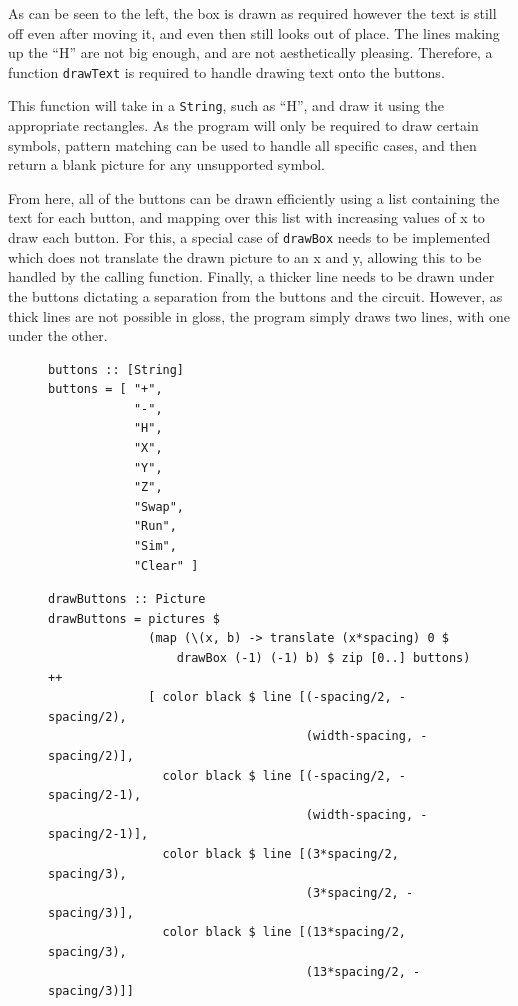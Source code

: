 \documentclass[a4paper,10pt, titlepage, twoside]{article}
\begin{document}
As can be seen to the left, the box is drawn as required however the text is still off even after moving it, and even then still looks out of place. The lines making up the ``H'' are not big enough, and are not aesthetically pleasing. Therefore, a function \texttt{drawText} is required to handle drawing text onto the buttons.\par
This function will take in a \texttt{String}, such as ``H'', and draw it using the appropriate rectangles. As the program will only be required to draw certain symbols, pattern matching can be used to handle all specific cases, and then return a blank picture for any unsupported symbol.\par
From here, all of the buttons can be drawn efficiently using a list containing the text for each button, and mapping over this list with increasing values of x to draw each button. For this, a special case of \texttt{drawBox} needs to be implemented which does not translate the drawn picture to an x and y, allowing this to be handled by the calling function. Finally, a thicker line needs to be drawn under the buttons dictating a separation from the buttons and the circuit. However, as thick lines are not possible in gloss, the program simply draws two lines, with one under the other.
\begin{figure}[H]
    \centering
    \begin{minipage}{0.25\textwidth}
        \begin{verbatim}
buttons :: [String]
buttons = [ "+",
            "-",
            "H",
            "X",
            "Y",
            "Z",
            "Swap",
            "Run",
            "Sim",
            "Clear" ]
        \end{verbatim}
    \end{minipage}
     \begin{minipage}{0.7\textwidth}
        \begin{verbatim}
drawButtons :: Picture
drawButtons = pictures $
              (map (\(x, b) -> translate (x*spacing) 0 $ 
                  drawBox (-1) (-1) b) $ zip [0..] buttons) ++
              [ color black $ line [(-spacing/2, -spacing/2), 
                                    (width-spacing, -spacing/2)],
                color black $ line [(-spacing/2, -spacing/2-1), 
                                    (width-spacing, -spacing/2-1)],
                color black $ line [(3*spacing/2, spacing/3), 
                                    (3*spacing/2, -spacing/3)],
                color black $ line [(13*spacing/2, spacing/3), 
                                    (13*spacing/2, -spacing/3)]]
        \end{verbatim}
    \end{minipage}
\end{figure}
\end{document}
